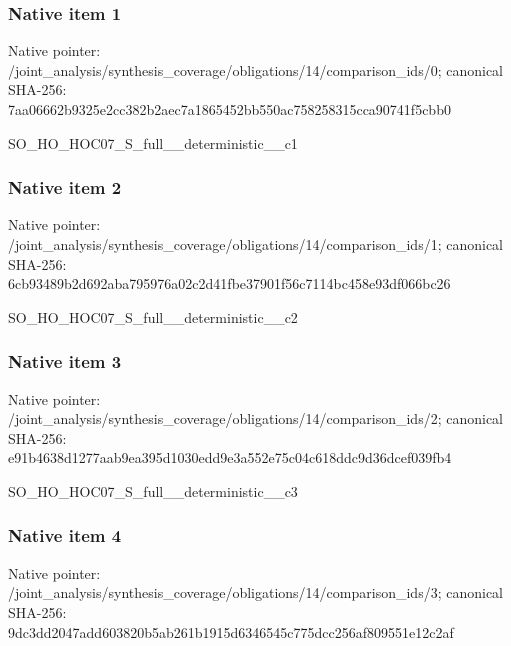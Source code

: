 \documentclass[10pt,a4paper]{article}
\begin{document}
\subsubsection{Native item 1}
Native pointer: /joint\_\allowbreak{}analysis/synthesis\_\allowbreak{}coverage/obligations/14/comparison\_\allowbreak{}ids/0; canonical SHA-256: 7aa06662b9325e2cc382b2aec7a1865452bb550ac758258315cca90741f5cbb0

\begingroup\raggedright\sloppy SO\_\allowbreak{}HO\_\allowbreak{}HOC07\_\allowbreak{}S\_\allowbreak{}full\_\allowbreak{}\_\allowbreak{}deterministic\_\allowbreak{}\_\allowbreak{}c1\par\endgroup

\subsubsection{Native item 2}
Native pointer: /joint\_\allowbreak{}analysis/synthesis\_\allowbreak{}coverage/obligations/14/comparison\_\allowbreak{}ids/1; canonical SHA-256: 6cb93489b2d692aba795976a02c2d41fbe37901f56c7114bc458e93df066bc26

\begingroup\raggedright\sloppy SO\_\allowbreak{}HO\_\allowbreak{}HOC07\_\allowbreak{}S\_\allowbreak{}full\_\allowbreak{}\_\allowbreak{}deterministic\_\allowbreak{}\_\allowbreak{}c2\par\endgroup

\subsubsection{Native item 3}
Native pointer: /joint\_\allowbreak{}analysis/synthesis\_\allowbreak{}coverage/obligations/14/comparison\_\allowbreak{}ids/2; canonical SHA-256: e91b4638d1277aab9ea395d1030edd9e3a552e75c04c618ddc9d36dcef039fb4

\begingroup\raggedright\sloppy SO\_\allowbreak{}HO\_\allowbreak{}HOC07\_\allowbreak{}S\_\allowbreak{}full\_\allowbreak{}\_\allowbreak{}deterministic\_\allowbreak{}\_\allowbreak{}c3\par\endgroup

\subsubsection{Native item 4}
Native pointer: /joint\_\allowbreak{}analysis/synthesis\_\allowbreak{}coverage/obligations/14/comparison\_\allowbreak{}ids/3; canonical SHA-256: 9dc3dd2047add603820b5ab261b1915d6346545c775dcc256af809551e12c2af
\end{document}
